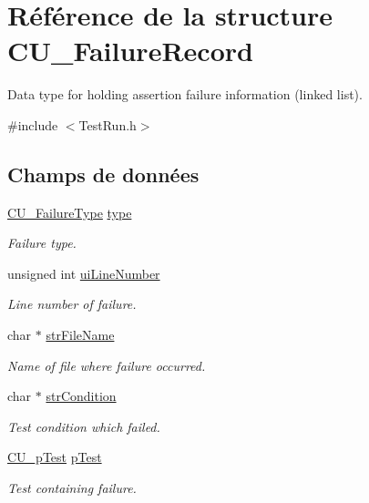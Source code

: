 \hypertarget{structCU__FailureRecord}{\section{Référence de la structure C\-U\-\_\-\-Failure\-Record}
\label{structCU__FailureRecord}
}


Data type for holding assertion failure information (linked list).  




{\ttfamily \#include $<$Test\-Run.\-h$>$}

\subsection*{Champs de données}
\begin{DoxyCompactItemize}
\item 
\hyperlink{group__Framework_ga763bde9f3b5258aaca9c65512d1b2219}{C\-U\-\_\-\-Failure\-Type} \hyperlink{structCU__FailureRecord_a62a59280fc5faa1156fdfb7536704887}{type}
\begin{DoxyCompactList}\small\item\em Failure type. \end{DoxyCompactList}\item 
unsigned int \hyperlink{structCU__FailureRecord_a124d4ce97d29bae29f952250da03536b}{ui\-Line\-Number}
\begin{DoxyCompactList}\small\item\em Line number of failure. \end{DoxyCompactList}\item 
char $\ast$ \hyperlink{structCU__FailureRecord_a5b72f6fe23e35605545809f435884da3}{str\-File\-Name}
\begin{DoxyCompactList}\small\item\em Name of file where failure occurred. \end{DoxyCompactList}\item 
char $\ast$ \hyperlink{structCU__FailureRecord_a645edad1e32b1533bd55c501b2c4d591}{str\-Condition}
\begin{DoxyCompactList}\small\item\em Test condition which failed. \end{DoxyCompactList}\item 
\hyperlink{group__Framework_ga249c43fbe4e53452b3f90db1437da04b}{C\-U\-\_\-p\-Test} \hyperlink{structCU__FailureRecord_ad1c88882d83b15d2c2d73a8562f8fced}{p\-Test}
\begin{DoxyCompactList}\small\item\em Test containing failure. \end{DoxyCompactList}\item 

\end{DoxyCompactItemize}
